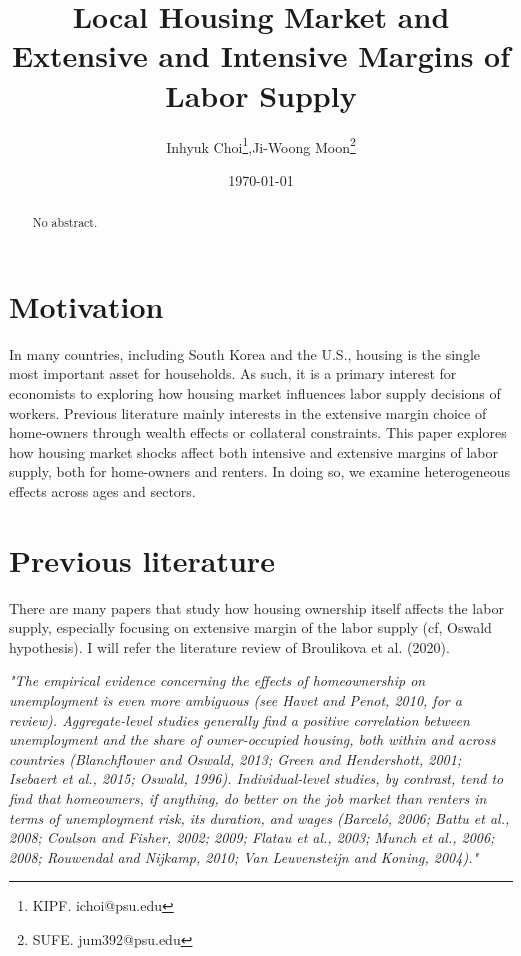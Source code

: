 \documentclass[12pt,letterpaper]{article}
\begin{document}
\title{\textbf{Local Housing Market and Extensive and Intensive Margins of Labor Supply}}%
\author{Inhyuk Choi\footnote{KIPF. ichoi@psu.edu},\quad Ji-Woong Moon\footnote{SUFE. jum392@psu.edu}}
\date{\today}
\maketitle
\begin{abstract}
No abstract.
\end{abstract}

\section{Motivation}
In many countries, including South Korea and the U.S., housing is the single most important asset for households. As such, it is a primary interest for economists to exploring how housing market influences labor supply decisions of workers. Previous literature mainly interests in the extensive margin choice of home-owners through wealth effects or collateral constraints. This paper explores how housing market shocks affect both intensive and extensive margins of labor supply, both for home-owners and renters. In doing so, we examine heterogeneous effects across ages and sectors.

\bigskip
\section{Previous literature}
There are many papers that study how housing ownership itself affects the labor supply, especially focusing on extensive margin of the labor supply (cf, Oswald hypothesis). I will refer the literature review of Broulikova et al. (2020). 

\textit{\small{"The empirical evidence concerning the effects of homeownership on unemployment is even more ambiguous (see Havet and Penot, 2010, for
a review). Aggregate-level studies generally find a positive correlation
between unemployment and the share of owner-occupied housing, both
within and across countries (Blanchflower and Oswald, 2013; Green
and Hendershott, 2001; Isebaert et al., 2015; Oswald, 1996). Individual-level studies, by contrast, tend to find that homeowners, if
anything, do better on the job market than renters in terms of unemployment risk, its duration, and wages (Barceló, 2006; Battu et al.,
2008; Coulson and Fisher, 2002; 2009; Flatau et al., 2003; Munch et al.,
2006; 2008; Rouwendal and Nijkamp, 2010; Van Leuvensteijn and
Koning, 2004)."}}
\end{document}
